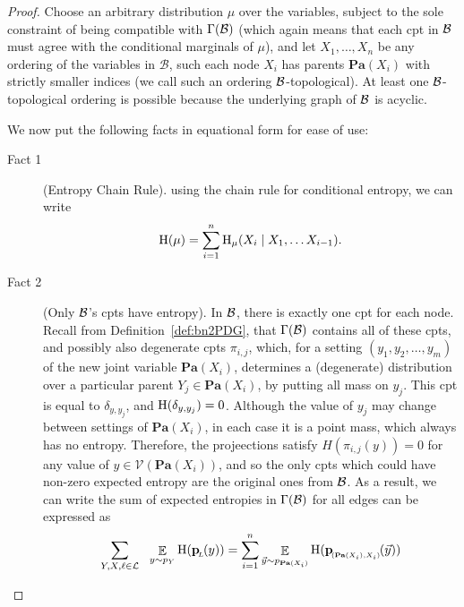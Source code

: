 \documentclass{article}
\newcommand{\bp}[1][L]{\mat{p}_{\!_{#1}\!}}
\newcommand{\V}{\mathcal V}
\newcommand\Pa{\mathbf{Pa}}
\numberwithin{equation}{section}
\begin{document}
		
	\thmbnsRpdgs*	
	\begin{proof}%
		Choose an arbitrary distribution $\mu$ over the variables, subject to the sole constraint of being compatible with $\Gamma(\cal B)$ (which again means that each cpt in $\cal B$ must agree with the conditional marginals of $\mu$), and let $X_1, \ldots, X_n$ be any ordering of the variables in $\mathcal B$, such each node $X_i$ has parents $\Pa(X_i)$ with strictly smaller indices (we call such an ordering $\cal B$-topological). At least one $\cal B$-topological ordering is possible because the underlying graph of $\cal B$ is acyclic. 
		
		We now put the following facts in equational form for ease of use:
		\begin{description}
			\item[Fact 1] (Entropy Chain Rule). using the chain rule for conditional entropy, we can write 
			\[ \mathrm{H}(\mu) = \sum_{i = 1}^n \mathrm{H}_\mu(X_i \mid X_1, \ldots X_{i-1}). \]
			\item[Fact 2] (Only $\cal B$'s cpts have entropy).
			In $\cal B$, there is exactly one cpt for each node. Recall from Definition~\ref{def:bn2PDG}, that $\Gamma(\cal B)$ contains all of these cpts, and possibly also degenerate cpts $\pi_{i,j}$, which, for a setting $(y_1, y_2, \ldots, y_m)$ of the new joint variable $\Pa(X_i)$, determines a (degenerate) distribution over a particular parent $Y_j \in \Pa(X_i)$, by putting all mass on $y_j$. This cpt is equal to $\delta_{y, y_j}$, and $\mathrm{H}(\delta_{y, y_j}) = 0$. Although the value of $y_j$ may change between settings of $\Pa(X_i)$, in each case it is a point mass, which always has no entropy. 
			Therefore, the projeections satisfy $H(\pi_{i,j}(y)) = 0$ for any value of $y \in \V(\Pa(X_i))$, and so the only cpts which could have non-zero expected entropy are the original ones from $\cal B$. As a result, we can write the sum of expected entropies in $\Gamma(\cal B)$ for all edges can be expressed as
			\[\sum_{Y,X, \ell \in \cal L} ~~\E_{y \sim p_Y}  \H (\bp ( y)) = \sum_{i=1}^n\E_{\vec y \sim p_{\Pa(X_i)}}  \H (\bp[(\Pa(X_i),X_i)] (\vec y))\]
			

\end{description}
\end{proof}
\end{document}

